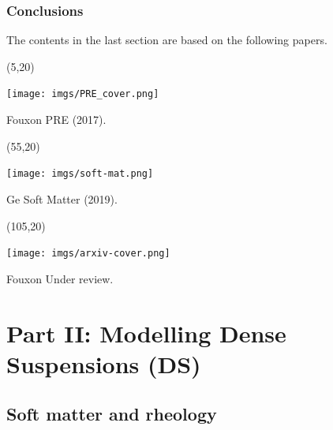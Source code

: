 \begin{frame}[noframenumbering,t]
  \frametitle{Conclusions}

  The contents in the last section are based on the following papers.
  
  \begin{textblock}{45}(5,20)
    \begin{tcolorbox}[beamer,
        width=\textwidth,
        arc=0pt,
        boxsep=1pt,
        left=0pt,right=0pt,top=0pt,bottom=0pt,
      ]
      \texttt{[image: imgs/PRE\_cover.png]}
    \end{tcolorbox}
    Fouxon \etal PRE (2017).
  \end{textblock}

  \begin{textblock}{45}(55,20)
    \begin{tcolorbox}[beamer,
        width=\textwidth,
        arc=0pt,
        boxsep=1pt,
        left=0pt,right=0pt,top=0pt,bottom=0pt,
      ]
      \texttt{[image: imgs/soft-mat.png]}
    \end{tcolorbox}
    Ge \etal Soft Matter (2019).
  \end{textblock}

  \begin{textblock}{45}(105,20)
    \begin{tcolorbox}[beamer,
        width=\textwidth,
        arc=0pt,
        boxsep=1pt,
        left=0pt,right=0pt,top=0pt,bottom=0pt,
      ]
      \texttt{[image: imgs/arxiv-cover.png]}
    \end{tcolorbox}
    Fouxon \etal Under review.
  \end{textblock}

\end{frame}

\hypertarget{part2}{%
  \section{Part II: Modelling Dense Suspensions (DS)}}

\hypertarget{background2}{%
  \subsection{Soft matter and rheology}}

